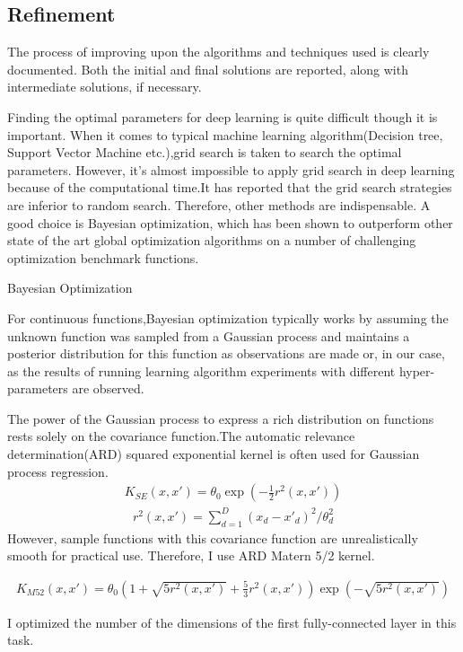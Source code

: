 \subsection{Refinement}
The process of improving upon the algorithms and techniques used is clearly documented. Both the initial and final solutions are reported, along with intermediate solutions, if necessary.

Finding the optimal parameters for deep learning is quite difficult though it is important. When it comes to typical machine learning algorithm(Decision tree, Support Vector Machine etc.),grid search is taken to search the optimal parameters. However, it's almost impossible to apply grid search in deep learning because of the computational time.It has reported that the grid search strategies are inferior to random search.\cite{Random} Therefore, other methods are indispensable. A good choice is Bayesian optimization, which has been shown to outperform other state of the art global optimization algorithms on a number of challenging optimization benchmark functions.

Bayesian Optimization

For continuous functions,Bayesian optimization typically works by assuming the unknown function was sampled from a Gaussian process and maintains a posterior distribution for this function as observations are made or, in our case, as the results of running learning algorithm experiments with different hyper-parameters are observed. 

The power of the Gaussian process to express a rich distribution on functions rests solely on the covariance function.The automatic relevance determination(ARD) squared exponential kernel is often used for Gaussian process regression.
\begin{eqnarray}
K_{SE}(x,x')=\theta_{0}\exp{(-\frac{1}{2}r^2(x,x'))} 
\end{eqnarray}
\begin{eqnarray}
r^2(x,x')=\sum^{D}_{d=1}(x_{d}-x'_{d})^2/\theta^2_{d}
\end{eqnarray}
However, sample functions with this covariance function are unrealistically smooth for practical use. Therefore,  I use ARD Matern 5/2 kernel.

\begin{eqnarray}
K_{M52}(x,x')=\theta_{0}(1+\sqrt{5r^2(x,x')}+\frac{5}{3}r^2(x,x'))\exp{(-\sqrt{5r^2(x,x')})}
\end{eqnarray}

I optimized the number of the dimensions of the first fully-connected layer in this task.